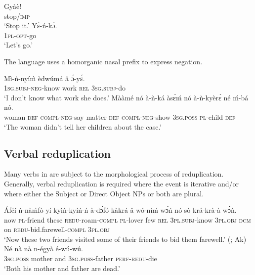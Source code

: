 \documentclass[output=paper]{langsci/langscibook}
\begin{document}
\ea\label{ex:11.osam}
\ea\label{ex:11a.osam}
\gll Gyàè!\\
       stop/\textsc{imp}\\
\glt   `Stop it.'
\ex\label{ex:11b.osam}
\gll  Yɛ́-ń-kɔ́.\\
       \textsc{1pl}-\textsc{opt}-go\\
\glt   `Let's go.'
\z 
\z 

The language uses a homorganic nasal prefix to express negation.

\ea\label{ex:12.osam}
\ea\label{ex:12a.osam}
\gll  Mì-ǹ-nyí\`{m}     èdwúmá  â   ɔ́-yɛ́.\\
       \textsc{1sg.subj}-\textsc{neg}-know  work    \textsc{rel}  \textsc{3sg.subj}-do\\
\glt   `I don't know what work she does.'
\ex\label{ex:12b.osam}
\gll   Mààmé    nó  à-ǹ-ká       àsɛ́ḿ  nó  à-ǹ-kyèrɛ́ né    ḿ-bá    nó.\\
       woman    \textsc{def}  \textsc{compl}-\textsc{neg}-say  matter  \textsc{def}  \textsc{compl}-\textsc{neg}-show    \textsc{3sg.poss}  \textsc{pl}-child  \textsc{def}\\
\glt   `The woman didn't tell her children about the case.'  
\z 
\z 

\subsection{Verbal reduplication}\label{§2.2:verbalreduplicaion.osam}

Many verbs in  are subject to the morphological process of reduplication. Generally, verbal reduplication is required where the event is iterative and/or where either the Subject or Direct Object NPs or both are plural.

\ea\label{ex:13.osam}
\ea\label{ex:13a.osam}
\gll   Áféí  ǹ-nà\`{m}fò   yí   kyìǹ-kyíń-ń     à-dɔ́fó     kàkrá â  wó-níḿ     wɔ́ń     nó   sò krá-krà-à       wɔ̀ǹ.\\
       now  \textsc{pl}-friend  these  \textsc{redu}-roam-\textsc{compl}  \textsc{pl}-lover  few \textsc{rel}  \textsc{3pl.subj}-know  \textsc{3pl.obj}  \textsc{dcm}  on \textsc{redu}-bid.farewell-\textsc{compl}  \textsc{3pl.obj}\\
\glt   `Now these two friends visited some of their friends to bid them farewell.' (\citealt[41]{adi1973}; Ak)
\ex\label{ex:13b.osam}
\gll   Né    nà    nà  n-égyà      é-wú-wú.\\
       \textsc{3sg.poss}  mother    and  \textsc{3sg.poss}-father  \textsc{perf-redu}-die\\
\glt   `Both his mother and father are dead.' \citep[24]{martin1936}
\z 
\z 
\end{document}
